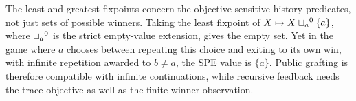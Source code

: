 The least and greatest fixpoints concern the objective-sensitive
history predicates, not just sets of possible winners. Taking the
least fixpoint of $X\mapsto X\mathbin{\sqcup_{a}}^{0}\{a\}$, where
$\mathbin{\sqcup_{a}}^{0}$ is the strict empty-value extension, gives the empty set.
Yet in the game where $a$ chooses between repeating this choice and
exiting to its own win, with infinite repetition awarded to $b\ne a$,
the SPE value is $\{a\}$. Public grafting is therefore compatible
with infinite continuations, while recursive feedback needs the
trace objective as well as the finite winner observation.
